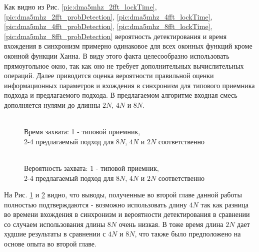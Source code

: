Как видно из Рис. \ref{pic:dma5mhz_2fft_lockTime}, \ref{pic:dma5mhz_2fft_probDetection}, \ref{pic:dma5mhz_4fft_lockTime}, \ref{pic:dma5mhz_4fft_probDetection},
\ref{pic:dma5mhz_8fft_lockTime}, \ref{pic:dma5mhz_8fft_probDetection} вероятность детектирования и время вхождения в синхронизм примерно одинаковое для всех оконных функций
кроме оконной функции Ханна. В виду этого факта целесообразно использовать прямоугольное окно, так как оно не требует дополнительных вычислительных операций.
Далее приводится оценка вероятности правильной оценки информационных параметров и вхождения в синхронизм для типового приемника подхода и предлагаемого подхода.
В предлагаемом алгоритме входная смесь дополняется нулями до длинны ${2N}$, ${4N}$ и ${8N}$.

\begin{figure}[h]
\center{}
	\caption{\\Время захвата: 1 - типовой приемник,\\2-4 предлагаемый подход для ${8N}$, ${4N}$ и ${2N}$ соответственно}
	\label{pic:dma5mhz_lockTime}
\end{figure}

\begin{figure}[h]
\center{}
	\caption{\\Вероятность захвата: 1 - типовой приемник,\\2-4 предлагаемый подход для ${8N}$, ${4N}$ и ${2N}$ соответственно}
	\label{pic:dma5mhz_probDetection}
\end{figure}

На Рис. \ref{pic:dma5mhz_lockTime} и \ref{pic:dma5mhz_probDetection} видно, что выводы, полученные во второй главе данной работы полностью подтверждаются - возможно использовать
длину ${4N}$ так как разница во времени вхождения в синхронизм и вероятности детектирования в сравнении со случаем использования длины ${8N}$ очень низкая. В тоже время
длина ${2N}$ дает худшие результаты в сравнении с ${4N}$ и ${8N}$, что также было предположено на основе опыта во второй главе.


